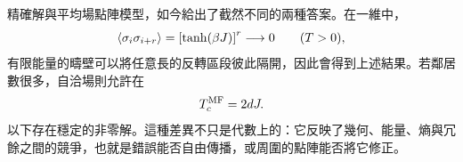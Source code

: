 精確解與平均場點陣模型，如今給出了截然不同的兩種答案。在一維中，
\begin{equation}
\left\langle\sigma_i\sigma_{i+r}\right\rangle
=\left[\tanh(\beta J)\right]^r
\longrightarrow0
\qquad (T>0),
\end{equation}
有限能量的疇壁可以將任意長的反轉區段彼此隔開，因此會得到上述結果。若鄰居數很多，自洽場則允許在
\begin{equation}
T_c^{\rm MF}=2dJ.
\end{equation}
以下存在穩定的非零解。這種差異不只是代數上的：它反映了幾何、能量、熵與冗餘之間的競爭，也就是錯誤能否自由傳播，或周圍的點陣能否將它修正。